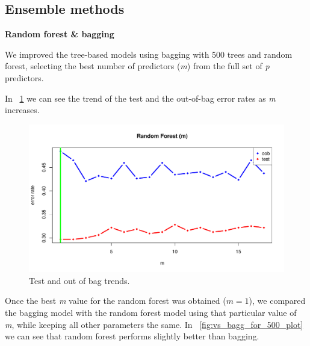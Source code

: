 \subsection{Ensemble methods}

\vspace{0.2cm}
\noindent
\textbf{Random forest \& bagging}

We improved the tree-based models using bagging with 500 trees and random forest, selecting the best number of predictors (\textit{m}) from the full set of \textit{p} predictors.

In \Fig~\ref{fig:m_best_for_500_plot} we can see the trend of the test and the out-of-bag error rates as \textit{m} increases.

\begin{figure}[H]
	\centering
	\includegraphics[width=0.5\linewidth]{ImageFiles/Classification/Trees/m_best_for_500_plot.pdf}
	\caption{Test and out of bag trends.}
	\label{fig:m_best_for_500_plot}
\end{figure}

Once the best \textit{m} value for the random forest was obtained ($m = 1$), we compared the bagging model with the random forest model using that particular value of \textit{m}, while keeping all other parameters the same.
In \Fig~\ref{fig:vs_bagg_for_500_plot} we can see that random forest performs slightly better than bagging.

